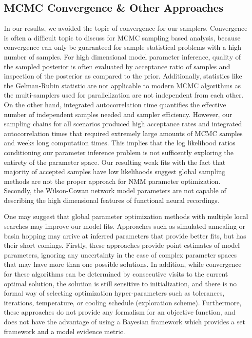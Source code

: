 \subsection{MCMC Convergence \& Other Approaches}
In our results, we avoided the topic of convergence for our samplers. Convergence is often a difficult topic to discuss for MCMC sampling based analysis, because convergence can only be guaranteed for sample statistical problems with a high number of samples. For high dimensional model parameter inference, quality of the sampled posterior is often evaluated by acceptance ratio of samples and inspection of the posterior as compared to the prior. Additionally, statistics like the Gelman-Rubin statistic \cite{gelman_inference_1992} are not applicable to modern MCMC algorithms as the multi-samplers used for parallelization are not independent from each other. On the other hand, integrated autocorrelation time \cite{goodman_ensemble_2010} quantifies the effective number of independent samples needed and sampler efficiency. However, our sampling chains for all scenarios produced high acceptance rates and integrated autocorrelation times that required extremely large amounts of MCMC samples and weeks long computation times. This implies that the log likelihood ratios conditioning our parameter inference problem is not sufficently exploring the entirety of the parameter space. Our resulting weak fits with the fact that majority of accepted samples have low likelihoods suggest global sampling methods are not the proper approach for NMM parameter optimization. Secondly, the Wilson-Cowan network model parameters are not capable of describing the high dimensional features of functional neural recordings.

One may suggest that global parameter optimization methods with multiple local searches may improve our model fits. Approaches such as simulated annealing \cite{Kirkpatrick1983} or basin hopping \cite{Wales1997} may arrive at inferred parameters that provide better fits, but has their short comings. Firstly, these approaches provide point estimates of model parameters, ignoring any uncertainty in the case of complex parameter spaces that may have more than one possible solutions. In addition, while convergence for these algorithms can be determined by consecutive visits to the current  optimal solution, the solution is still sensitive to initialization, and there is no formal way of selecting optimization hyper-parameters such as tolerances, iterations, temperature, or cooling schedule (exploration scheme). Furthermore, these approaches do not provide any formalism for an objective function, and does not have the advantage of using a Bayesian framework which provides a set framework and a model evidence metric. 


